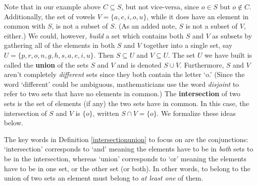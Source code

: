 \medskip

Note that in our example above $C \subseteq S$, but not vice-versa, since $o \in S$ but $o \notin C$.  Additionally, the set of vowels $V = \{ a, e, i, o, u\}$, while it does have an element in common with $S$, is not a subset of $S$. (As an added note,  $S$ is not a subset of $V$, either.)  We could, however, \textit{build} a set which contains both $S$ and $V$ as subsets by gathering all of the elements in both $S$ and $V$ together into a single set, say $U = \{ p, r, o, n, g, h, s, a, e, i, u\}$.   Then $S \subseteq U$ and $V \subseteq U$.  The set $U$ we have built is called the \textbf{union} of the sets $S$ and $V$ and is denoted $S \cup V$.    Furthermore, $S$ and $V$ aren't completely \textit{different} sets since they both contain the letter `o.' (Since the word `different' could be ambiguous, mathematicians use the word \textit{disjoint} to refer to two sets that have no elements in common.) The \textbf{intersection} of two sets is the set of elements (if any) the two sets have in common. In this case, the intersection of $S$ and $V$ is $\{ o\}$, written $S \cap V = \{ o \}$.  We formalize these ideas below.

\medskip


\medskip

The key words in Definition \ref{intersectionunion} to focus on are the conjunctions:  `intersection' corresponds to `and' meaning the elements have to be in \textit{both} sets to be in the intersection, whereas `union' corresponds to `or' meaning the elements have to be in one set, or the other set (or both).  In other words, to belong to the union of two sets an element must belong to \textit{at least one} of them.


